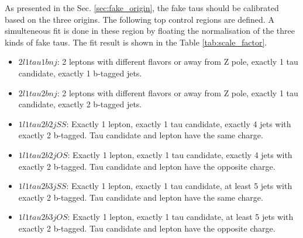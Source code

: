 
As presented in the Sec. \ref{sec:fake_origin}, the fake taus should be calibrated based on the three origins. The following top control regions are defined. A simulteneous fit is done in these region by floating the normalisation of the three kinds of fake taus. The fit result is shown in the Table \ref{tab:scale_factor}.

\begin{itemize}
\item{$2l1tau1bnj$: 2 leptons with different flavors or away from Z pole, exactly 1 tau candidate,  exactly 1 b-tagged jets.}
\item{$2l1tau2bnj$: 2 leptons with different flavors or away from Z pole, exactly 1 tau candidate,  exactly 2 b-tagged jets.}
\item{$1l1tau2b2j SS$: Exactly 1 lepton, exactly 1 tau candidate, exactly 4 jets with exactly 2 b-tagged. Tau candidate and lepton have the same charge.}
\item{$1l1tau2b2j OS$: Exactly 1 lepton, exactly 1 tau candidate, exactly 4 jets with exactly 2 b-tagged. Tau candidate and lepton have the opposite charge.}
\item{$1l1tau2b3j SS$: Exactly 1 lepton, exactly 1 tau candidate, at least 5 jets with exactly 2 b-tagged. Tau candidate and lepton have the same charge.}
\item{$1l1tau2b3j OS$: Exactly 1 lepton, exactly 1 tau candidate, at least 5 jets with exactly 2 b-tagged. Tau candidate and lepton have the opposite charge.}
\end{itemize}

